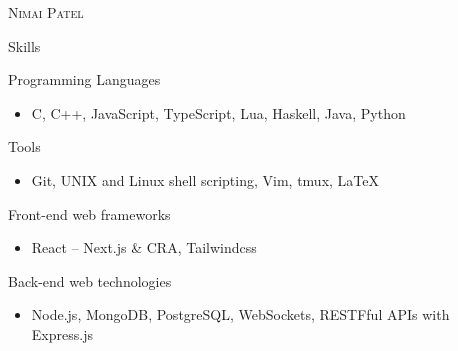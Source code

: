 \documentclass{article}
\newlength{\tabin}
\newlength{\secsep}
\newcommand{\lineunder}{\vspace*{-8pt} \\ \hspace*{-6pt} \hrulefill \\ \vspace*{-15pt}}
\newcommand{\name}[1]{\begin{center}\textsc{\Huge#1}\\\end{center}}
\newcommand{\contact}[1]{\begin{center}\color{contactgray}{\small#1}\end{center}}
\newenvironment{tabbedsection}[1]{
  \begin{list}{}{
      \setlength{\itemsep}{0pt}
      \setlength{\labelsep}{0pt}
      \setlength{\labelwidth}{0pt}
      \setlength{\leftmargin}{\tabin}
      \setlength{\rightmargin}{\tabin}
      \setlength{\listparindent}{0pt}
      \setlength{\parsep}{0pt}
      \setlength{\parskip}{0pt}
      \setlength{\partopsep}{0pt}
      \setlength{\topsep}{#1}
    }
  \item[]
}{\end{list}}
\newenvironment{nospacetabbing}{
    \begin{tabbing}
}{\end{tabbing}\vspace{-1.2em}}
\newenvironment{resume_header}{\color{MyPurple}}{\vspace{0pt}}
\newenvironment{resume_section}[1]{
  \filbreak
  \vspace{2\secsep}
  \textsc{\large#1}
  \lineunder
  \begin{tabbedsection}{\secsep}
}{\end{tabbedsection}}
\newenvironment{resume_subsection}[2][]{
  \textbf{#2} \hfill {\footnotesize #1} \hspace{2em}
  \begin{tabbedsection}{0.5\secsep}
}{\end{tabbedsection}}
\newenvironment{subitems}{
  \renewcommand{\labelitemi}{-}
  \begin{itemize}
      \setlength{\labelsep}{1em}
}{\end{itemize}}
\begin{document}
\begin{resume_header}
\name{Nimai Patel}
    \contact{nimaipatel@tutanota.com}
\end{resume_header}

%


\begin{resume_section}{Skills}
    \begin{resume_subsection}{Programming Languages}
        \begin{subitems}
            \item C, C++, JavaScript, TypeScript, Lua, Haskell, Java, Python

        \end{subitems}
    \end{resume_subsection}

    \begin{resume_subsection}{Tools}
        \begin{subitems}
        \item Git, UNIX and Linux shell scripting, Vim, tmux, {\LaTeX}
        \end{subitems}
    \end{resume_subsection}

    \begin{resume_subsection}{Front-end web frameworks}
        \begin{subitems}
        \item React -- Next.js \& CRA, Tailwindcss
        \end{subitems}
    \end{resume_subsection}

    \begin{resume_subsection}{Back-end web technologies}
        \begin{subitems}
        \item Node.js, MongoDB, PostgreSQL, WebSockets, RESTFful APIs with Express.js
        \end{subitems}
    \end{resume_subsection}

\end{resume_section}
\end{document}
